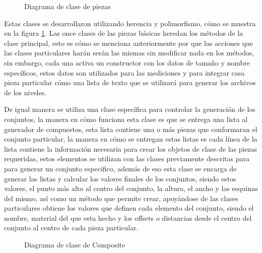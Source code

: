 \begin{figure}
  \centering
  \scalebox{.43}{}
  \caption{Diagrama de clase de piezas}
  \label{figure:pieces-class-diagram}
\end{figure}

Estas clases se desarrollaron utilizando herencia y polimorfismo, cómo se muestra en la figura
\ref{figure:pieces-class-diagram}. Las once clases de las piezas básicas heredan
los métodos de la clase principal, esto es cómo se menciona anteriormente por
que las acciones que las clases particulares harán serán las mismas sin
modificar nada en los métodos, sin embargo, cada una activa un constructor con
los datos de tamaño y nombre específicos, estos datos son utilizados para las
mediciones y para integrar casa pieza particular cómo una lista de texto que se
utilizará para generar los archivos de los niveles.

De igual manera se utiliza una clase específica para controlar la generación de
los conjuntos, la manera en cómo funciona esta clase es que se entrega una lista
al generador de compuestos, esta lista contiene una o más piezas que conformaran
el conjunto particular, la manera en cómo se entregan estas listas es cada línea
de la lista contiene la información necesaria para crear los objetos de clase de
las piezas requeridas, estos elementos se utilizan con las clases previamente
descritas para para generar un conjunto especifico, además de eso esta clase se
encarga de generar las listas y calcular los valores finales de los conjuntos,
siendo estos valores, el punto más alto al centro del conjunto, la altura, el
ancho y las esquinas del mismo, así como un método que permite crear, apoyándose
de las clases particulares obtiene los valores que definen cada elemento del
conjunto, siendo el nombre, material del que esta hecho y los offsets o
distancias desde el centro del conjunto al centro de cada pieza particular.

\begin{figure}
  \centering
  \scalebox{.65}{}
  \caption{Diagrama de clase de Composite}
  \label{figure:composite-class-diagram}
\end{figure}

